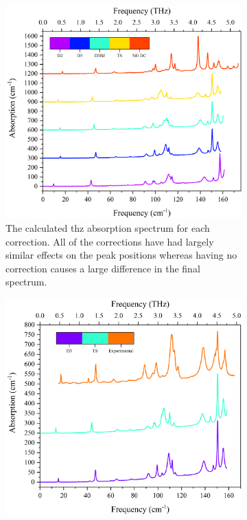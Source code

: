 \begin{figure}
\centering
\begin{subfigure}{1\textwidth}
    \centering
    \includegraphics[scale=0.49]{Figures/Spectra/SpecCompScG.png}
    \caption{The calculated \acrshort{thz} absorption spectrum for each correction. All of the corrections have had largely similar effects on the peak positions whereas having no correction causes a large difference in the final spectrum. }
    \label{fig:vdw_results_all}
\end{subfigure}
\begin{subfigure}{1\textwidth}
    \centering
    \includegraphics[scale=0.49]{Figures/Spectra/ExpCompG.png}

\end{subfigure}
\end{figure}
